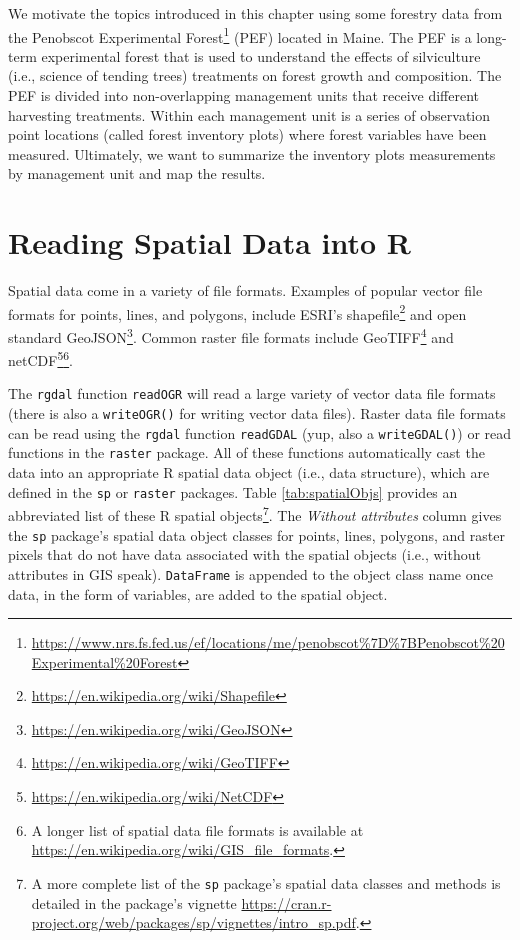 \documentclass[
]{krantz}
\renewcommand{\href}[2]{#2\footnote{\url{#1}}}
\begin{document}
We motivate the topics introduced in this chapter using some forestry data from the \href{https://www.nrs.fs.fed.us/ef/locations/me/penobscot\%7D\%7BPenobscot\%20Experimental\%20Forest}{Penobscot Experimental Forest} (PEF) located in Maine. The PEF is a long-term experimental forest that is used to understand the effects of silviculture (i.e., science of tending trees) treatments on forest growth and composition. The PEF is divided into non-overlapping management units that receive different harvesting treatments. Within each management unit is a series of observation point locations (called forest inventory plots) where forest variables have been measured. Ultimately, we want to summarize the inventory plots measurements by management unit and map the results.

\hypertarget{reading-spatial-data-into-r}{%
\section{Reading Spatial Data into R}\label{reading-spatial-data-into-r}}

Spatial data come in a variety of file formats. Examples of popular vector file formats for points, lines, and polygons, include ESRI's \href{https://en.wikipedia.org/wiki/Shapefile}{shapefile} and open standard \href{https://en.wikipedia.org/wiki/GeoJSON}{GeoJSON}. Common raster file formats include \href{https://en.wikipedia.org/wiki/GeoTIFF}{GeoTIFF} and \href{https://en.wikipedia.org/wiki/NetCDF}{netCDF}\footnote{A longer list of spatial data file formats is available at \url{https://en.wikipedia.org/wiki/GIS_file_formats}.}.

The \texttt{rgdal} function \texttt{readOGR} will read a large variety of vector data file formats (there is also a \texttt{writeOGR()} for writing vector data files). Raster data file formats can be read using the \texttt{rgdal} function \texttt{readGDAL} (yup, also a \texttt{writeGDAL()}) or read functions in the \texttt{raster} package. All of these functions automatically cast the data into an appropriate R spatial data object (i.e., data structure), which are defined in the \texttt{sp} or \texttt{raster} packages. Table \ref{tab:spatialObjs} provides an abbreviated list of these R spatial objects\footnote{A more complete list of the \texttt{sp} package's spatial data classes and methods is detailed in the package's vignette \url{https://cran.r-project.org/web/packages/sp/vignettes/intro_sp.pdf}.}. The \emph{Without attributes }column gives the \texttt{sp} package's spatial data object classes for points, lines, polygons, and raster pixels that do not have data associated with the spatial objects (i.e., without attributes in GIS speak). \texttt{DataFrame} is appended to the object class name once data, in the form of variables, are added to the spatial object.
\end{document}
